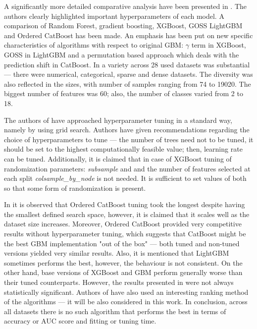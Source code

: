 \documentclass[magisterska, english]{pwr_wmat_praca_dyplomowa}
\theoremstyle{plain}
\numberwithin{theorem}{chapter}
\theoremstyle{definition}
\numberwithin{theorem}{chapter}
\begin{document}
A significantly more detailed comparative analysis have been presented in \cite{comparative_analysis}. The authors clearly highlighted important hyperparameters of each model. A comparison of Random Forest, gradient boosting, XGBoost, GOSS LightGBM and Ordered CatBoost has been made. An emphasis has been put on new specific characteristics of algorithms with respect to original GBM: $\gamma$ term in XGBoost, GOSS in LightGBM and a permutation based approach which deals with the prediction shift in CatBoost. In \cite{comparative_analysis} a variety across 28 used datasets was substantial --- there were numerical, categorical, sparse and dense datasets. The diversity was also reflected in the sizes, with number of samples ranging from 74 to 19020. The biggest number of features was 60; also, the number of classes varied from 2 to 18.

The authors of \cite{comparative_analysis} have approached hyperparameter tuning in a standard way, namely by using grid search. Authors have given recommendations regarding the choice of hyperparameters to tune --- the number of trees need not to be tuned, it should be set to the highest computationally feasible value; then, learning rate can be tuned. Additionally, it is claimed that in case of XGBoost tuning of randomization parameters: \emph{subsample} \cite{friedman_stoch} and and the number of features selected at each split \emph{colsample\_by\_node} is not needed. It is sufficient to set values of both so that some form of randomization is present.

In \cite{comparative_analysis} it is observed that Ordered CatBoost tuning took the longest despite having the smallest defined search space, however, it is claimed that it scales well as the dataset size increases. Moreover, Ordered CatBoost provided very competitive results without hyperparameter tuning, which suggests that CatBoost might be the best GBM implementation "out of the box" --- both tuned and non-tuned versions yielded very similar results. Also, it is mentioned that LightGBM sometimes performs the best, however, the behaviour is not consistent. On the other hand, base versions of XGBoost and GBM perform generally worse than their tuned counterparts. However, the results presented in \cite{comparative_analysis} were not always statistically significant.
Authors of \cite{comparative_analysis} have also used an interesting ranking method of the algorithms --- it will be also considered in this work. In conclusion, across all datasets there is no such algorithm that performs the best in terms of accuracy or AUC score and fitting or tuning time.
\end{document}
